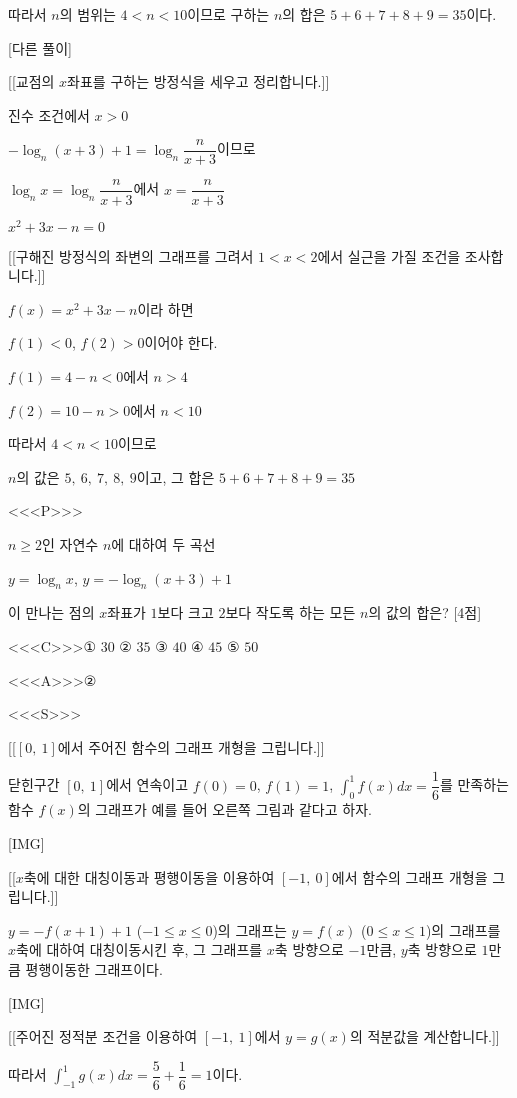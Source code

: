 \documentclass{oblivoir}
\begin{document}
따라서 $n$의 범위는 $4< n < 10$이므로 구하는 $n$의 합은 $5+6+7+8+9=35$이다.

[다른 풀이]

[[교점의 $x$좌표를 구하는 방정식을 세우고 정리합니다.]]

진수 조건에서 $x>0$

$-\log_{n}(x+3)+1=\log_{n}\dfrac{n}{x+3}$이므로

$\log_{n}x=\log_{n}\dfrac{n}{x+3}$에서 $x=\dfrac{n}{x+3}$

$x^{2}+3x-n=0$

[[구해진 방정식의 좌변의 그래프를 그려서 $1< x < 2$에서 실근을 가질 조건을 조사합니다.]]

$f(x)= x^{2}+3x-n$이라 하면

$f(1)< 0$, $f(2)>0$이어야 한다.

$f(1)=4-n< 0$에서 $n >4$

$f(2)=10-n>0$에서 $n< 10$

따라서 $4< n< 10$이므로

$n$의 값은 $5,\:6,\:7,\:8,\:9$이고, 그 합은 $5+6+7+8+9=35$

<<<P>>>

$n\ge 2$인 자연수 $n$에 대하여 두 곡선

$y=\log_{n}x$, $y= -\log_{n}(x+3)+1$

이 만나는 점의 $x$좌표가 $1$보다 크고 $2$보다 작도록 하는 모든 $n$의 값의 합은? [4점]

<<<C>>>① $30$ ② $35$ ③ $40$ ④ $45$ ⑤ $50$

<<<A>>>②

<<<S>>>

[[$[0,\:1]$에서 주어진 함수의 그래프 개형을 그립니다.]]

닫힌구간 $[0,\:1]$에서 연속이고 $f(0)=0$, $f(1)=1$, $\displaystyle\int_{0}^{1}f(x)dx =\dfrac{1}{6}$를 만족하는 함수 $f(x)$의 그래프가 예를 들어 오른쪽 그림과 같다고 하자.

[IMG]

[[$x$축에 대한 대칭이동과 평행이동을 이용하여 $[-1,\:0]$에서 함수의 그래프 개형을 그립니다.]]

$y=-f(x+1)+1$ ($-1\le x\le 0$)의 그래프는 $y=f(x)$ ($0\le x\le 1$)의 그래프를 $x$축에 대하여 대칭이동시킨 후, 그 그래프를 $x$축 방향으로 $-1$만큼, $y$축 방향으로 $1$만큼 평행이동한 그래프이다. 

[IMG]

[[주어진 정적분 조건을 이용하여 $[-1,\:1]$에서 $y=g(x)$의 적분값을 계산합니다.]]

따라서 $\displaystyle\int_{-1}^{1}g(x)dx=\dfrac{5}{6}+\dfrac{1}{6}=1$이다.
\end{document}
